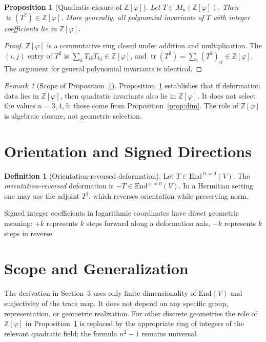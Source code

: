 \documentclass[12pt]{article}
\newtheorem{proposition}[theorem]{Proposition}
\theoremstyle{definition}
\newtheorem{definition}[theorem]{Definition}
\theoremstyle{remark}
\newtheorem{remark}[theorem]{Remark}
\newcommand{\Z}{\mathbb{Z}}
\newcommand{\End}{\mathrm{End}}
\newcommand{\Endzero}{\mathrm{End}^{\,\mathrm{tr}=0}}
\begin{document}
\begin{proposition}[Quadratic closure of \texorpdfstring{$\Z[\varphi]$}{Z[phi]}]
\label{prop:closure}
Let $T\in M_n(\Z[\varphi])$. Then $\operatorname{tr}(T^2)\in\Z[\varphi]$.
More generally, all polynomial invariants of $T$ with integer coefficients
lie in $\Z[\varphi]$.
\end{proposition}

\begin{proof}
$\Z[\varphi]$ is a commutative ring closed under addition and multiplication.
The $(i,j)$ entry of $T^2$ is $\sum_k T_{ik}T_{kj}\in\Z[\varphi]$, and
$\operatorname{tr}(T^2)=\sum_i(T^2)_{ii}\in\Z[\varphi]$. The argument
for general polynomial invariants is identical.
\end{proof}

\begin{remark}[Scope of Proposition~\ref{prop:closure}]
Proposition~\ref{prop:closure} establishes that if deformation data lies
in $\Z[\varphi]$, then quadratic invariants also lie in $\Z[\varphi]$.
It does not select the values $n=3,4,5$; those come from
Proposition~\ref{prop:dim}. The role of $\Z[\varphi]$ is algebraic
closure, not geometric selection.
\end{remark}

\section{Orientation and Signed Directions}

\begin{definition}[Orientation-reversed deformation]
Let $T\in\Endzero(V)$. The \emph{orientation-reversed} deformation is
$-T\in\Endzero(V)$. In a Hermitian setting one may use the adjoint $T^\dagger$,
which reverses orientation while preserving norm.
\end{definition}

Signed integer coefficients in logarithmic coordinates have direct geometric
meaning: $+k$ represents $k$ steps forward along a deformation axis,
$-k$ represents $k$ steps in reverse.

\section{Scope and Generalization}

The derivation in Section~3 uses only finite dimensionality of $\End(V)$
and surjectivity of the trace map. It does not depend on any specific group,
representation, or geometric realization. For other discrete geometries
the role of $\Z[\varphi]$ in Proposition~\ref{prop:closure} is replaced by
the appropriate ring of integers of the relevant quadratic field; the
formula $n^2-1$ remains universal.
\end{document}
